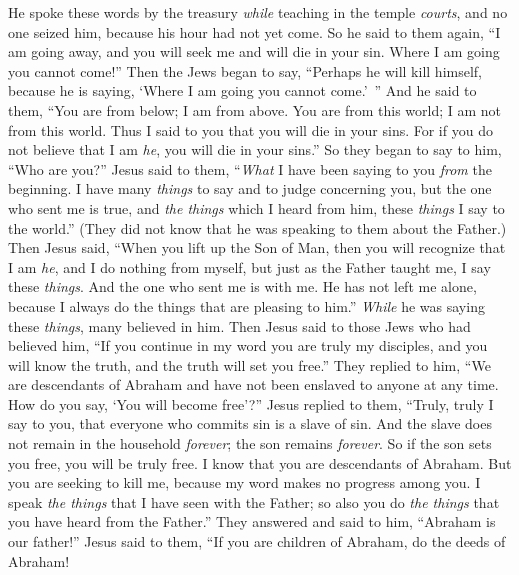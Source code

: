 \begin{biblechapter}
\verse He spoke these words by the treasury \textit{while} teaching in the temple \textit{courts}, and no one seized him, because his hour had not yet come.
 So he said to them again, “I am going away, and you will seek me and will die in your sin. Where I am going you cannot come!”
\verse Then the Jews began to say, “Perhaps he will kill himself, because he is saying, ‘Where I am going you cannot come.’ ”
\verse And he said to them, “You are from below; I am from above. You are from this world; I am not from this world.
\verse Thus I said to you that you will die in your sins. For if you do not believe that I am \textit{he}, you will die in your sins.”
\verse So they began to say to him, “Who are you?” Jesus said to them, “\textit{What} I have been saying to you \textit{from} the beginning.
\verse I have many \textit{things} to say and to judge concerning you, but the one who sent me is true, and \textit{the things} which I heard from him, these \textit{things} I say to the world.”
\verse (They did not know that he was speaking to them about the Father.)
\verse Then Jesus said, “When you lift up the Son of Man, then you will recognize that I am \textit{he}, and I do nothing from myself, but just as the Father taught me, I say these \textit{things}.
\verse And the one who sent me is with me. He has not left me alone, because I always do the things that are pleasing to him.”
\verse \textit{While} he was saying these \textit{things}, many believed in him.
 Then Jesus said to those Jews who had believed him, “If you continue in my word you are truly my disciples,
\verse and you will know the truth, and the truth will set you free.”
\verse They replied to him, “We are descendants of Abraham and have not been enslaved to anyone at any time. How do you say, ‘You will become free’?”
\verse Jesus replied to them, “Truly, truly I say to you, that everyone who commits sin is a slave of sin.
\verse And the slave does not remain in the household \textit{forever}; the son remains \textit{forever}.
\verse So if the son sets you free, you will be truly free.
\verse I know that you are descendants of Abraham. But you are seeking to kill me, because my word makes no progress among you.
\verse I speak \textit{the things} that I have seen with the Father; so also you do \textit{the things} that you have heard from the Father.”
 They answered and said to him, “Abraham is our father!” Jesus said to them, “If you are children of Abraham, do the deeds of Abraham!

\end{biblechapter}
